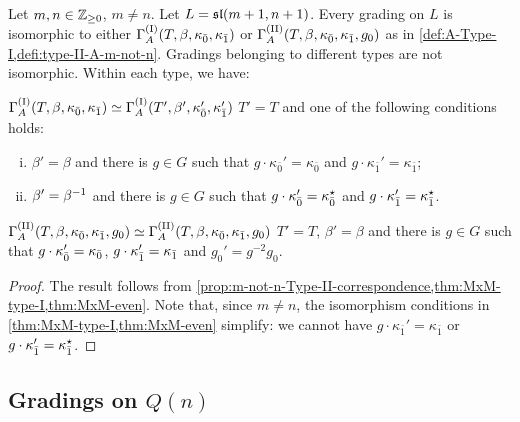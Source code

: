 \begin{thm}\label{thm:final-m-not-n}
    Let $m,n \in \mathbb{Z}_{\geq 0}$, $m \neq n$. 
    Let $L = \mathfrak{sl}(m+1, n+1)$. 
    Every grading on $L$ is isomorphic to either $\Gamma_A^{\mathrm{(I)}}(T, \beta, \kappa_{\bar{0}}, \kappa_{\bar{1}})$ or $\Gamma_A^{\mathrm{(II)}}(T,\beta, \kappa_{\bar{0}}, \kappa_{\bar{1}}, g_0)$ as in \cref{def:A-Type-I,defi:type-II-A-m-not-n}. 
    Gradings belonging to different types are not isomorphic. 
    Within each type, we have:
    
    \noindent{}
    
    \noindent $\Gamma_A^{\mathrm{(I)}}(T, \beta, \kappa_{\bar{0}}, \kappa_{\bar{1}}) \simeq \Gamma_A^{\mathrm{(I)}}(T', \beta', \kappa_{\bar{0}}', \kappa_{\bar{1}}')$ \IFF  $T' = T$ and one of the following conditions holds:
	\begin{enumerate}[(i)]
	    \item $\beta'=\beta$ and there is $g\in G$ such that $g \cdot \kappa_{\bar 0}'=\kappa_{\bar 0}$ and $g \cdot \kappa_{\bar 1}'=\kappa_{\bar 1}$; 
	    \item $\beta'=\beta^{-1}$ and there is $g\in G$ such that $g \cdot \kappa_{\bar 0}'=\kappa_{\bar 0}^\star$ and $g \cdot \kappa_{\bar 1}'=\kappa_{\bar 1}^\star$.
	\end{enumerate}

    \noindent{}
    
    \noindent $\Gamma_A^{\mathrm{(II)}}(T,\beta, \kappa_{\bar{0}}, \kappa_{\bar{1}}, g_0) \simeq \Gamma_A^{\mathrm{(II)}}(T,\beta, \kappa_{\bar{0}}, \kappa_{\bar{1}}, g_0)$ \IFF
    $T' =T$, $\beta' = \beta$ and there is $g \in G$ such that $g\cdot\kappa_{\bar{0}}' = \kappa_{\bar{0}}$, $g\cdot\kappa_{\bar{1}}' = \kappa_{\bar{1}}$ and $g_0' = g^{-2}g_0$.
\end{thm}

\begin{proof}
    The result follows from \cref{prop:m-not-n-Type-II-correspondence,thm:MxM-type-I,thm:MxM-even}. 
    Note that, since $m \neq n$, the isomorphism conditions in \cref{thm:MxM-type-I,thm:MxM-even} simplify: we cannot have $g \cdot \kappa_{\bar 1}'=\kappa_{\bar 1}$ or $g \cdot \kappa_{\bar 1}'=\kappa_{\bar 1}^\star$. 
\end{proof}


\subsection{Gradings on \texorpdfstring{$Q(n)$}{Q(n)}}

